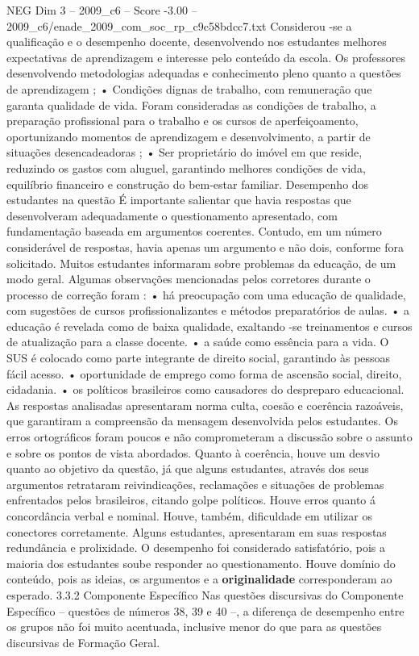 \begin{textsample}{NEG Dim 3 – 2009\_c6 – Score -3.00 – 2009\_c6/enade\_2009\_com\_soc\_rp\_c9c58bdcc7.txt}
Considerou -se a qualificação e o desempenho docente, desenvolvendo nos estudantes melhores expectativas de aprendizagem e interesse pelo conteúdo da escola.
Os professores desenvolvendo metodologias adequadas e conhecimento pleno quanto a questões de aprendizagem ; • Condições dignas de trabalho, com remuneração que garanta qualidade de vida.
Foram consideradas as condições de trabalho, a preparação profissional para o trabalho e os cursos de aperfeiçoamento, oportunizando momentos de aprendizagem e desenvolvimento, a partir de situações desencadeadoras ; • Ser proprietário do imóvel em que reside, reduzindo os gastos com aluguel, garantindo melhores condições de vida, equilíbrio financeiro e construção do bem-estar familiar.
Desempenho dos estudantes na questão É importante salientar que havia respostas que desenvolveram adequadamente o questionamento apresentado, com fundamentação baseada em argumentos coerentes.
Contudo, em um número considerável de respostas, havia apenas um argumento e não dois, conforme fora solicitado.
Muitos estudantes informaram sobre problemas da educação, de um modo geral.
Algumas observações mencionadas pelos corretores durante o processo de correção foram : • há preocupação com uma educação de qualidade, com sugestões de cursos profissionalizantes e métodos preparatórios de aulas. • a educação é revelada como de baixa qualidade, exaltando -se treinamentos e cursos de atualização para a classe docente. • a saúde como essência para a vida.
O SUS é colocado como parte integrante de direito social, garantindo às pessoas fácil acesso. • oportunidade de emprego como forma de ascensão social, direito, cidadania. • os políticos brasileiros como causadores do despreparo educacional.
As respostas analisadas apresentaram norma culta, coesão e coerência razoáveis, que garantiram a compreensão da mensagem desenvolvida pelos estudantes.
Os erros ortográficos foram poucos e não comprometeram a discussão sobre o assunto e sobre os pontos de vista abordados.
Quanto à coerência, houve um desvio quanto ao objetivo da questão, já que alguns estudantes, através dos seus argumentos retrataram reivindicações, reclamações e situações de problemas enfrentados pelos brasileiros, citando golpe políticos.
Houve erros quanto á concordância verbal e nominal.
Houve, também, dificuldade em utilizar os conectores corretamente.
Alguns estudantes, apresentaram em suas respostas redundância e prolixidade.
O desempenho foi considerado satisfatório, pois a maioria dos estudantes soube responder ao questionamento.
Houve domínio do conteúdo, pois as ideias, os argumentos e a \textbf{originalidade} corresponderam ao esperado. 3.3.2 Componente Específico Nas questões discursivas do Componente Específico – questões de números 38, 39 e 40 –, a diferença de desempenho entre os grupos não foi muito acentuada, inclusive menor do que para as questões discursivas de Formação Geral.

\end{textsample}
